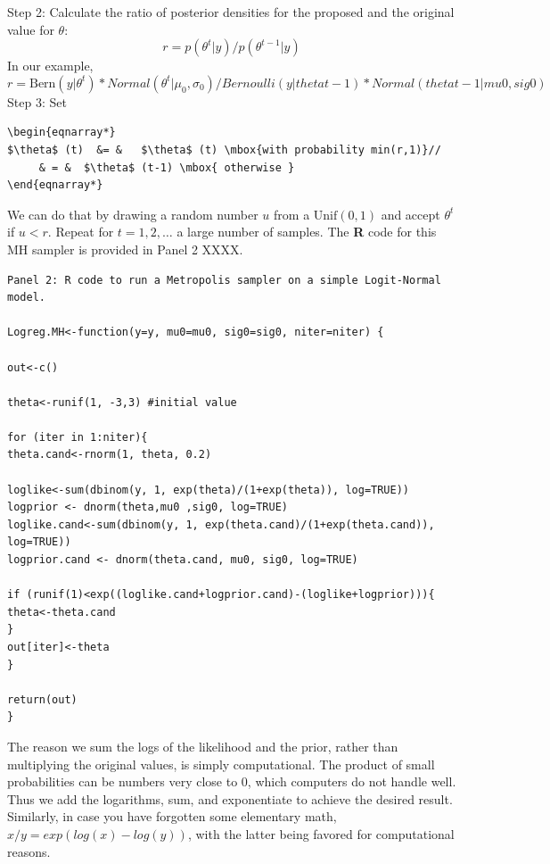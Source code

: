 {\flushleft Step 2: Calculate the ratio of posterior densities for the proposed and the original value for $\theta$: }
\[
r = p(\theta^{t}|y) / p(\theta^{t-1}|y)
\]
In our example,
\[
r = \mbox{Bern}(y|\theta^{t}) * Normal(\theta^{t}|\mu_0, \sigma_0) / Bernoulli(y|thetat-1) * Normal(thetat-1|mu0, sig0)
\]
Step 3: Set
\begin{verbatim}
\begin{eqnarray*}
$\theta$ (t)  &= &   $\theta$ (t) \mbox{with probability min(r,1)}//
	 & = & 	$\theta$ (t-1) \mbox{ otherwise }
\end{eqnarray*}
\end{verbatim}


We can do that by drawing a random number $u$ from a
$\mbox{Unif}(0,1)$ and accept $\theta^{t}$ if
$u<r$.
Repeat for $t = 1,2,\ldots$ a large number of samples.
The {\bf R} code for this MH sampler is provided in Panel 2 XXXX.
{\small
\begin{verbatim}
Panel 2: R code to run a Metropolis sampler on a simple Logit-Normal model.

Logreg.MH<-function(y=y, mu0=mu0, sig0=sig0, niter=niter) {

out<-c()

theta<-runif(1, -3,3) #initial value

for (iter in 1:niter){
theta.cand<-rnorm(1, theta, 0.2)

loglike<-sum(dbinom(y, 1, exp(theta)/(1+exp(theta)), log=TRUE))
logprior <- dnorm(theta,mu0 ,sig0, log=TRUE)
loglike.cand<-sum(dbinom(y, 1, exp(theta.cand)/(1+exp(theta.cand)), log=TRUE))
logprior.cand <- dnorm(theta.cand, mu0, sig0, log=TRUE)

if (runif(1)<exp((loglike.cand+logprior.cand)-(loglike+logprior))){
theta<-theta.cand
}
out[iter]<-theta
}

return(out)
}
\end{verbatim}
}

The reason we sum the logs of the likelihood and the prior, rather than multiplying the original values, is simply computational. The product of small probabilities can be numbers very close to 0, which computers do not handle well. Thus we add the logarithms, sum, and exponentiate to achieve the desired result. Similarly, in case you have forgotten some elementary math, $x/y = exp(log(x)-log(y))$, with the latter being favored for computational reasons.

